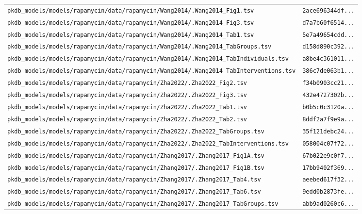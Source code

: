 \documentclass{article}
\begin{document}
\begin{longtable}{ll}
\texttt{pkdb\_models/models/rapamycin/data/rapamycin/Wang2014/.Wang2014\_Fig1.tsv} & \texttt{2ace696344df...} \\
\texttt{pkdb\_models/models/rapamycin/data/rapamycin/Wang2014/.Wang2014\_Fig3.tsv} & \texttt{d7a7b60f6514...} \\
\texttt{pkdb\_models/models/rapamycin/data/rapamycin/Wang2014/.Wang2014\_Tab1.tsv} & \texttt{5e7a49654cdd...} \\
\texttt{pkdb\_models/models/rapamycin/data/rapamycin/Wang2014/.Wang2014\_TabGroups.tsv} & \texttt{d158d890c392...} \\
\texttt{pkdb\_models/models/rapamycin/data/rapamycin/Wang2014/.Wang2014\_TabIndividuals.tsv} & \texttt{a8be4c361011...} \\
\texttt{pkdb\_models/models/rapamycin/data/rapamycin/Wang2014/.Wang2014\_TabInterventions.tsv} & \texttt{386c7de063b1...} \\
\texttt{pkdb\_models/models/rapamycin/data/rapamycin/Zha2022/.Zha2022\_Fig2.tsv} & \texttt{f34b0903cc21...} \\
\texttt{pkdb\_models/models/rapamycin/data/rapamycin/Zha2022/.Zha2022\_Fig3.tsv} & \texttt{432e4727302b...} \\
\texttt{pkdb\_models/models/rapamycin/data/rapamycin/Zha2022/.Zha2022\_Tab1.tsv} & \texttt{b0b5c0c3120a...} \\
\texttt{pkdb\_models/models/rapamycin/data/rapamycin/Zha2022/.Zha2022\_Tab2.tsv} & \texttt{8ddf2a7f9e9a...} \\
\texttt{pkdb\_models/models/rapamycin/data/rapamycin/Zha2022/.Zha2022\_TabGroups.tsv} & \texttt{35f121debc24...} \\
\texttt{pkdb\_models/models/rapamycin/data/rapamycin/Zha2022/.Zha2022\_TabInterventions.tsv} & \texttt{058004c07f72...} \\
\texttt{pkdb\_models/models/rapamycin/data/rapamycin/Zhang2017/.Zhang2017\_Fig1A.tsv} & \texttt{67b022e9c0f7...} \\
\texttt{pkdb\_models/models/rapamycin/data/rapamycin/Zhang2017/.Zhang2017\_Fig1B.tsv} & \texttt{17bb9402f369...} \\
\texttt{pkdb\_models/models/rapamycin/data/rapamycin/Zhang2017/.Zhang2017\_Tab4.tsv} & \texttt{aeebed617f32...} \\
\texttt{pkdb\_models/models/rapamycin/data/rapamycin/Zhang2017/.Zhang2017\_Tab6.tsv} & \texttt{9edd0b2873fe...} \\
\texttt{pkdb\_models/models/rapamycin/data/rapamycin/Zhang2017/.Zhang2017\_TabGroups.tsv} & \texttt{abb9ad0260c6...} \\

\end{longtable}
\end{document}
